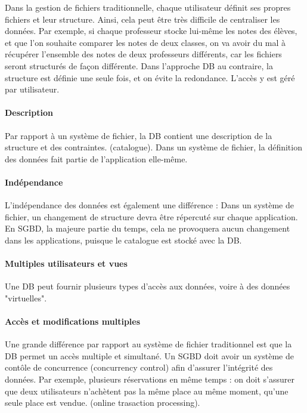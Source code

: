 Dans la gestion de fichiers traditionnelle, chaque utilisateur définit 
ses propres fichiers et leur structure. Ainsi, cela peut être très difficile 
de centraliser les données. Par exemple, si chaque professeur stocke lui-même 
les notes des élèves, et que l'on souhaite comparer les notes de deux classes, 
on va avoir du mal à récupérer l'ensemble des notes de deux professeurs différents, 
car les fichiers seront structurés de façon différente.
Dans l'approche DB au contraire, la structure est définie une seule fois, et on 
évite la redondance. L'accès y est géré par utilisateur.

\paragraph{Description}Par rapport à un système de fichier, la DB contient une description 
de la structure et des contraintes. (catalogue). Dans un système de fichier, la 
définition des données fait partie de l'application elle-même. 

\paragraph{Indépendance}L'indépendance des données est également une différence : Dans un système de fichier, 
un changement de structure devra être répercuté sur chaque application.
En SGBD, la majeure partie du temps, cela ne provoquera aucun changement 
dans les applications, puisque le catalogue est stocké avec la DB.

\paragraph{Multiples utilisateurs et vues} Une DB peut fournir plusieurs 
types d'accès aux données, voire à des données "virtuelles". 

\paragraph{Accès et modifications multiples} Une grande différence par rapport 
au système de fichier traditionnel est que la DB permet un accès 
multiple et simultané. Un SGBD doit avoir un système de contôle de concurrence 
(concurrency control) afin d'assurer l'intégrité des données. 
Par exemple, plusieurs réservations en même temps : on doit s'assurer que 
deux utilisateurs n'achètent pas la même place au même moment, qu'une 
seule place est vendue. (online trasaction processing).


